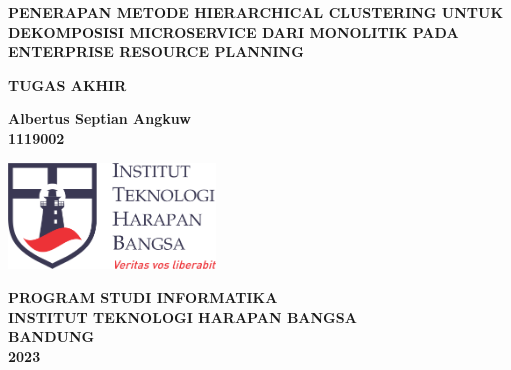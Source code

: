 \begin{titlepage}
	\begin{center}
		\vspace*{0cm}
		
		{\large \bfseries PENERAPAN METODE HIERARCHICAL CLUSTERING UNTUK DEKOMPOSISI MICROSERVICE DARI MONOLITIK PADA ENTERPRISE RESOURCE PLANNING \\}
			
		\vspace{3cm}
		
	 	{\large \bfseries TUGAS AKHIR}

		\vspace{2.5cm}
		
		{ \bfseries Albertus Septian Angkuw \\ 1119002 }
		
	
		\vspace*{\fill} 
		
		\includegraphics[width=5.5cm]{img/ithb.png}
	
		\vspace{2.5cm}

		{\large \bfseries PROGRAM STUDI INFORMATIKA \\
		INSTITUT TEKNOLOGI HARAPAN BANGSA \\
		BANDUNG\\
		2023}
		
		\vspace{1cm}
	\end{center}
\end{titlepage}